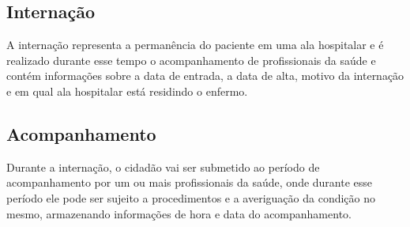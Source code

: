 \documentclass[12pt, a4paper]{article}
\begin{document}
\subsection*{Internação}
    A internação representa a permanência do paciente em uma ala hospitalar e é
    realizado durante esse tempo o acompanhamento de profissionais da saúde e contém
    informações sobre a data de entrada, a data de alta, motivo da internação e em qual ala
    hospitalar está residindo o enfermo.

\subsection*{Acompanhamento}
    Durante a internação, o cidadão vai ser submetido ao período de acompanhamento
    por um ou mais profissionais da saúde, onde durante esse período ele pode ser sujeito a
    procedimentos e a averiguação da condição no mesmo, armazenando informações de
    hora e data do acompanhamento.
\end{document}
